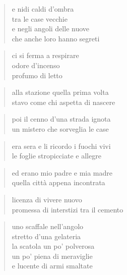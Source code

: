 \clearpage


\begin{verse}
    e nidi caldi d'ombra\\
    tra le case vecchie\\
    e negli angoli delle nuove\\
    che anche loro hanno segreti
\end{verse}

\begin{verse}
    ci si ferma a respirare\\
    odore d'incenso\\
    profumo di letto
\end{verse}

\clearpage


\begin{verse}
    alla stazione quella prima volta\\
    stavo come chi aspetta di nascere
\end{verse}

\begin{verse}
    poi il cenno d'una strada ignota\\
    un mistero che sorveglia le case
\end{verse}

\begin{verse}
    era sera e li ricordo i fuochi vivi\\
    le foglie stropicciate e allegre
\end{verse}

\begin{verse}
    ed erano mio padre e mia madre\\
    quella città appena incontrata
\end{verse}

\begin{verse}
    licenza di vivere nuovo\\
    promessa di interstizi tra il cemento
\end{verse}

\clearpage


\begin{verse}
    uno scaffale nell'angolo\\
    stretto d'una gelateria\\
    la scatola un po' polverosa\\
    un po' piena di meraviglie\\
    e lucente di armi smaltate
\end{verse}

